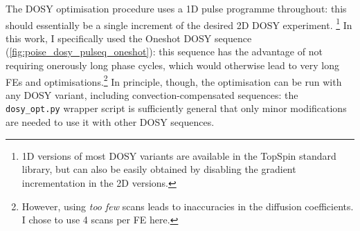 The DOSY optimisation procedure uses a 1D pulse programme throughout: this should essentially be a single increment of the desired 2D DOSY experiment.%
\footnote{1D versions of most DOSY variants are available in the TopSpin standard library, but can also be easily obtained by disabling the gradient incrementation in the 2D versions.}
In this work, I specifically used the Oneshot DOSY sequence\autocite{Pelta2002MRC} (\cref{fig:poise_dosy_pulseq_oneshot}): this sequence has the advantage of not requiring onerously long phase cycles, which would otherwise lead to very long FEs and optimisations.\footnote{However, using \textit{too few} scans leads to inaccuracies in the diffusion coefficients.\autocite{Pelta2002MRC} I chose to use 4 scans per FE here.}
In principle, though, the optimisation can be run with any DOSY variant, including convection-compensated sequences: the \texttt{dosy\_opt.py} wrapper script is sufficiently general that only minor modifications are needed to use it with other DOSY sequences.

